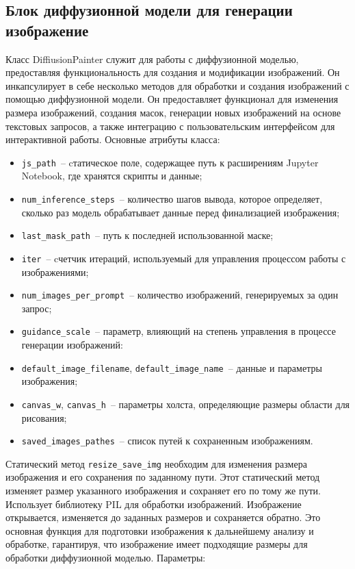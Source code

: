 \subsection{Блок диффузионной модели для генерации изображение}

Класс DiffiusionPainter служит для работы с диффузионной моделью, предоставляя функциональность для создания и модификации изображений. Он инкапсулирует в себе несколько методов для обработки и создания изображений с помощью диффузионной модели. Он предоставляет функционал для изменения размера изображений, создания масок, генерации новых изображений на основе текстовых запросов, а также интеграцию с пользовательским интерфейсом для интерактивной работы. Основные атрибуты класса:

\begin{itemize}
    \item \lstinline{js_path}~-- cтатическое поле, содержащее путь к расширениям Jupyter Notebook, где хранятся скрипты и данные;
    \item \lstinline{num_inference_steps}~-- количество шагов вывода, которое определяет, сколько раз модель обрабатывает данные перед финализацией изображения;
    \item \lstinline{last_mask_path}~-- путь к последней использованной маске;
    \item \lstinline{iter}~-- cчетчик итераций, используемый для управления процессом работы с изображениями;
    \item \lstinline{num_images_per_prompt}~-- количество изображений, генерируемых за один запрос;
    \item \lstinline{guidance_scale}~-- параметр, влияющий на степень управления в процессе генерации изображений:
    \item \lstinline{default_image_filename}, \lstinline{default_image_name}~-- данные и параметры изображения;
    \item \lstinline{canvas_w}, \lstinline{canvas_h}~-- параметры холста, определяющие размеры области для рисования;
    \item \lstinline{saved_images_pathes}~-- список путей к сохраненным изображениям.
\end{itemize}

Статический метод \lstinline{resize_save_img} необходим для изменения размера изображения и его сохранения по заданному пути. Этот статический метод изменяет размер указанного изображения и сохраняет его по тому же пути. Использует библиотеку PIL для обработки изображений. Изображение открывается, изменяется до заданных размеров и сохраняется обратно. Это основная функция для подготовки изображения к дальнейшему анализу и обработке, гарантируя, что изображение имеет подходящие размеры для обработки диффузионной моделью. Параметры:

